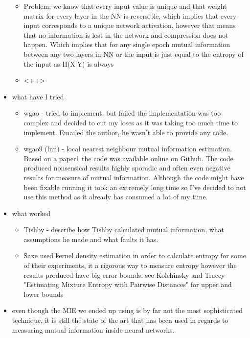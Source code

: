\begin{itemize}
{\begin{itemize}
{          }
        \item{
            Problem: we know that every input value is unique and that weight
            matrix for every layer in the NN is reversible, which implies that
            every input corresponds to a unique network activation, however that
            means that no information is lost in the network and compression
            does not happen. Which implies that for any single epoch mutual
            information between any two layers in NN or the input is just equal to the entropy of the input as H(X|Y) is always 

          }
        \item{
            <++>
          }
      \end{itemize}



    }
  \item{
      what have I tried
      \begin{itemize}
        \item{
            wgao - tried to implement, but failed the implementation was too
            complex and decided to cut my loses as it was taking too much time
            to implement. Emailed the author, he wasn't able to provide any
            code.
          }
        \item{
            wgao9 (lnn) - local nearest neighbour mutual information estimation.
            Based on a paper1 the code was available online on Github.
            The code produced nonsensical results highly sporadic and often even
            negative results for measure of mutual information. Although the
            code might have been fixable running it took an extremely long time
            so I've decided to not use this method as it already has consumed a
            lot of my time.
          }
      \end{itemize}
    }
  \item{
      what worked
      \begin{itemize}
        \item{
            Tishby - describe how Tishby calculated mutual information, what
            assumptions he made and what faults it has.
          }
        \item{
            Saxe used kernel density estimation in order to calculate entropy
            for some of their experiments, it a rigorous way to measure entropy
            however the results produced have big error bounds. see Kolchinsky
            and Tracey "Estimating Mixture Entropy with Pairwise Distances" for
            upper and lower bounds
          }
      \end{itemize}
    }
  \item{
      even though the MIE we ended up using is by far not the most sophisticated
      technique, it is still the state of the art that has been used in regards
      to measuring mutual information inside neural networks.
    }
\end{itemize}
    


